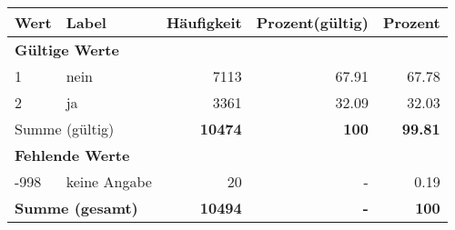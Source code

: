      \begin{longtable}{lXrrr}
     \toprule
     \textbf{Wert} & \textbf{Label} & \textbf{Häufigkeit} & \textbf{Prozent(gültig)} & \textbf{Prozent} \\
     \endhead
     \midrule
     \multicolumn{5}{l}{\textbf{Gültige Werte}}\\

     1 &
     \multicolumn{1}{X}{ nein   } &


       \num{7113} &
       \num[round-mode=places,round-precision=2]{67,91} &
         \num[round-mode=places,round-precision=2]{67,78} \\

     2 &
     \multicolumn{1}{X}{ ja   } &


       \num{3361} &
       \num[round-mode=places,round-precision=2]{32,09} &
         \num[round-mode=places,round-precision=2]{32,03} \\
     \midrule
     \multicolumn{2}{l}{Summe (gültig)} &
       \textbf{\num{10474}} &
     \textbf{100} &
       \textbf{\num[round-mode=places,round-precision=2]{99,81}} \\
     \multicolumn{5}{l}{\textbf{Fehlende Werte}}\\
       -998 &
       keine Angabe &
         \num{20} &
        - &
         \num[round-mode=places,round-precision=2]{0,19} \\
     \midrule
     \multicolumn{2}{l}{\textbf{Summe (gesamt)}} &
          \textbf{\num{10494}} &
        \textbf{-} &
        \textbf{100} \\
     \bottomrule
     \end{longtable}
     
